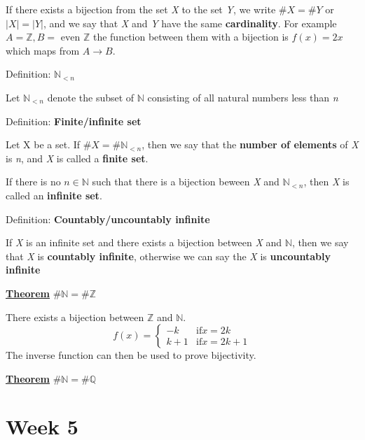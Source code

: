 \documentclass{article}
\newcommand*{\N}{\mathbb{N}}
\newcommand*{\Z}{\mathbb{Z}}
\newcommand*{\Q}{\mathbb{Q}}
\begin{document}
If there exists a bijection from the set \textit{X} to the set \textit{Y}, we write \(\#X = \#Y\) or \(|X| = |Y|\), and we say that \textit{X} and \textit{Y} have the same \textbf{cardinality}. For example \(A = \Z, B = \text{ even }\Z\) the function between them with a bijection is \(f(x) = 2x\) which maps from \(A\to B\).

\vspace{\baselineskip}
Definition: \(\N_{<n}\)

Let \(\N_{<n}\) denote the subset of \(\N\) consisting of all natural numbers less than \textit{n}

\vspace{\baselineskip}
Definition: \textbf{Finite/infinite set}

Let X be a set. If \(\#X = \#\N_{<n}\), then we say that the \textbf{number of elements} of \textit{X} is \textit{n}, and \textit{X} is called a \textbf{finite set}.

If there is no \(n \in \N\) such that there is a bijection beween \textit{X} and \(\N_{<n}\), then \textit{X} is called an \textbf{infinite set}.

\vspace{\baselineskip}
Definition: \textbf{Countably/uncountably infinite}

If \textit{X} is an infinite set and there exists a bijection between \textit{X} and \(\N\), then we say that \textit{X} is \textbf{countably infinite}, otherwise we can say the \textit{X} is \textbf{uncountably infinite}

\vspace{\baselineskip}
\textbf{\underline{Theorem}} \(\#\N = \#\Z\)

There exists a bijection between \(\Z\) and \(\N\).
\begin{equation}
    f(x) = 
    \begin{cases} 
       -k & \text{if} x=2k \\
       k+1 & \text{if} x=2k+1
   \end{cases}    
\end{equation}
The inverse function can then be used to prove bijectivity.

\vspace{\baselineskip}
\textbf{\underline{Theorem}} \(\#\N = \#\Q\)

\section{Week 5}
\end{document}
